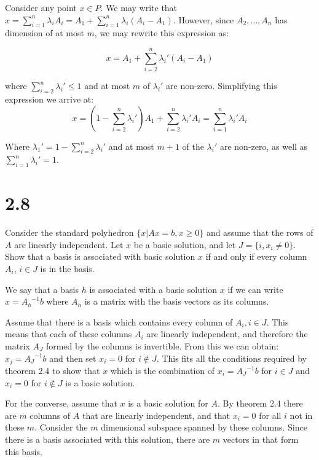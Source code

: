 \documentclass[12pt]{paper}
\newcommand{\inv}[1]{{#1}^{-1}}
\begin{document}
Consider any point $x \in P$. We may write that $x = \sum_{i=1}^n \lambda_i
A_i = A_1 + \sum_{i=1}^n \lambda_i (A_i - A_1)$. However, since $A_2, ..., A_n$
has dimension of at most $m$, we may rewrite this expression as:

\begin{equation*}
  x = A_1 + \sum_{i=2}^n \lambda_i' (A_i - A_1)
\end{equation*}

where $\sum_{i=2}^n \lambda_i' \leq 1$ and at most $m$ of $\lambda_i'$ are
non-zero. Simplifying this expression we arrive at:
\begin{equation*}
  x = (1 - \sum_{i=2}^n \lambda_i')A_1 + \sum_{i=2}^n \lambda_i' A_i = \sum_{i=1}^n \lambda_i' A_i
\end{equation*}

Where $\lambda_1' = 1 - \sum_{i=2}^n \lambda_i'$ and at most $m+1$ of the $\lambda_i'$ are
non-zero, as well as $\sum_{i=1}^n\lambda_i' = 1$.

\section{2.8}

Consider the standard polyhedron $\{ x \vert Ax = b, x \geq 0 \}$ and assume
that the rows of $A$ are linearly independent. Let $x$ be a basic
solution, and let $J = \{ i, x_i\neq 0\}$. Show that a basis is
associated with basic solution $x$ if and only if every column $A_i$,
$i \in J$ is in the basis.

\vspace{.3in}

We say that a basis $h$ is associated with a basic solution $x$ if we can
write $x = \inv{A_h}b$ where $A_h$ is a matrix with the basis vectors
as its columns.

Assume that there is a basis which contains every column of $A_i, i \in
J$. This means that each of these columns $A_i$ are linearly
independent, and therefore the matrix $A_J$ formed by the columns is
invertible. From this we can obtain: $x_j = \inv{A_J}b$ and then set
$x_i = 0$ for $i \notin J$. This fits all the conditions required by
theorem 2.4 to show that $x$ which is the combination of $x_i =
\inv{A_J}b$ for $i \in J$ and $x_i = 0$ for $i \notin J$ is a basic solution.

For the converse, assume that $x$ is a basic solution for $A$. By
theorem 2.4 there are $m$ columns of $A$ that are linearly
independent, and that $x_i = 0$ for all $i$ not in these $m$. Consider
the $m$ dimensional subspace spanned by these columns. Since there is
a basis associated with this solution, there are $m$ vectors in that
form this basis.
\end{document}
